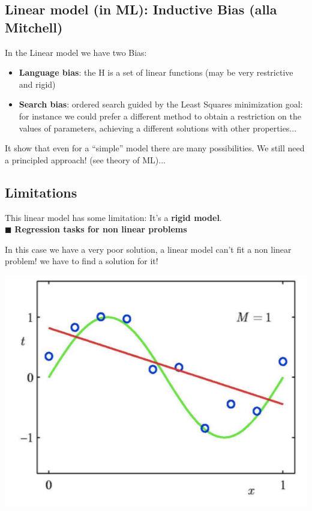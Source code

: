 \documentclass[../main.tex]{subfiles}
\begin{document}
\subsection{Linear model (in ML): Inductive Bias (alla Mitchell)}
In the Linear model we have two Bias:
\begin{itemize}
    \item \textbf{Language bias}: the H is a set of linear functions (may be very restrictive and rigid)

    \item \textbf{Search bias}: ordered search guided by the Least Squares minimization goal: for instance we could prefer a different method to obtain a restriction on the values of parameters, achieving a different solutions with other properties...

\end{itemize}

It show that even for a “simple” model there are many possibilities. We still need a principled approach! (see theory of ML)...

\subsection{Limitations}
This linear model has some limitation: It's a \textbf{rigid model}.\\

\noindent$\blacksquare$ \textbf{Regression tasks for non linear problems}\\

\begin{minipage}{0.5\textwidth}
In this case we have a very poor solution, a linear model can't fit a non linear problem! we have to find a solution for it!
\end{minipage}
\hfill
\begin{minipage}{0.5\textwidth}
\includegraphics[width=\linewidth]{lectures/1_Introduction/intro_poly_1}
\end{minipage}
\newpage
\end{document}
